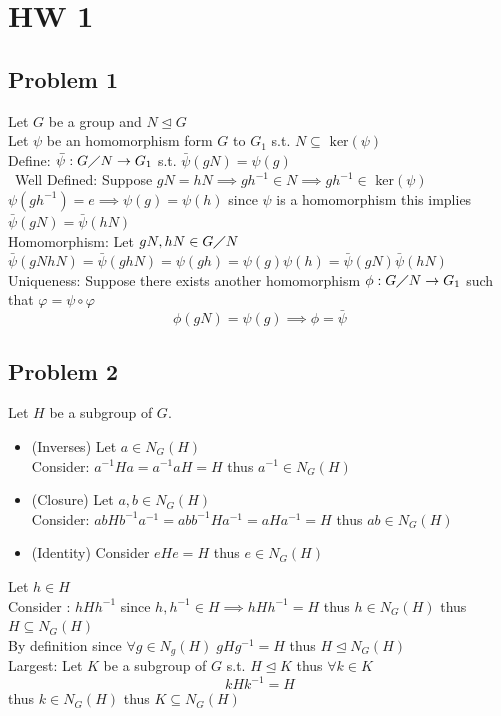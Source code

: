 \documentclass[12pt, letterpaper]{article}
\theoremstyle{definition}
\begin{document}
\pagestyle{fancy}
\fancyhf{}
\fancyhead[ROE]{\thepage}

\section*{HW 1}

\subsection*{Problem 1}
Let $G$ be a group and $N \unlhd G$\\
Let $\psi$ be an homomorphism form $G$ to $G_1$ s.t. $N \subseteq \text{ ker}(\psi)$\\
Define: $\bar{\psi}: G \diagup N \rightarrow G_1$ s.t. $\bar{\psi}(gN)=\psi(g)$\\\
Well Defined: Suppose $gN=hN \implies gh^{-1} \in N \implies gh^{-1} \in $ ker$(\psi)$\\
$\psi(gh^{-1})=e \implies \psi(g)=\psi(h)$ since $\psi$ is a homomorphism this implies $\bar{\psi}(gN)=\bar{\psi}(hN)$\\
Homomorphism: Let $gN,hN \in G \diagup N$\\
$\bar{\psi}(gNhN)=\bar{\psi}(ghN)=\psi(gh)=\psi(g)\psi(h)=\bar{\psi}(gN)\bar{\psi}(hN)$\\
Uniqueness: Suppose there exists another homomorphism $\phi: G\diagup  N \rightarrow G_1$ such that $\varphi=\psi \circ \varphi$\\
\[
\phi(gN)=\psi(g) \implies \phi = \bar{\psi}
\]

\newpage
\subsection*{Problem 2}
Let $H$ be a subgroup of $G$.
\begin{itemize}
    \item (Inverses) Let $a \in N_G(H)$\\
    Consider: $a^{-1}Ha=a^{-1}aH=H$ thus $a^{-1} \in N_G(H)$
    \item (Closure) Let $a,b \in N_G(H)$\\
    Consider: $abHb^{-1}a^{-1} = abb^{-1}Ha^{-1}=aHa^{-1}=H$ thus $ab \in N_G(H)$
    \item (Identity) Consider $eHe=H$ thus $e \in N_G(H)$
\end{itemize}
Let $h \in H$\\
Consider : $hHh^{-1}$ since $h,h^{-1} \in H \implies hHh^{-1}=H$ thus $h \in N_G(H)$ thus $H \subseteq N_G(H)$\\
By definition since $\forall g \in N_g(H)\; gHg^{-1}=H$ thus $H \unlhd N_G(H)$\\
Largest: Let $K$ be a subgroup of $G$ s.t. $H \unlhd K$ thus $\forall k \in K$ 
\[kHk^{-1}=H \]
thus $k \in N_G(H)$ thus $K \subseteq N_G(H)$
\end{document}
